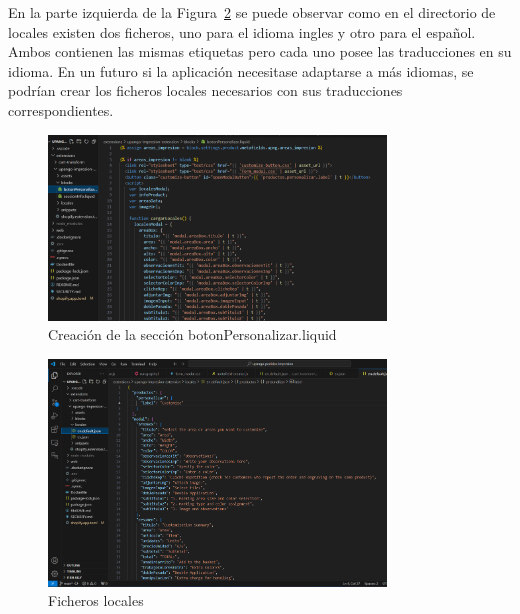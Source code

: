 \documentclass[11pt]{article}
\begin{document}
En la parte izquierda de la Figura~\ref{fig:locales} se puede observar como en el directorio de locales existen dos ficheros, uno para el idioma ingles y otro para el español. 
Ambos contienen las mismas etiquetas pero cada uno posee las traducciones en su idioma. En un futuro si la aplicación necesitase adaptarse a más idiomas, se podrían crear los ficheros locales
necesarios con sus traducciones correspondientes.


\begin{figure}[H]
    \centering
    \includegraphics[width=0.8\textwidth]{imagenesUS1/seccionPersonalizarBoton.png}
    \caption{\label{fig:creacionSeccion}Creación de la sección botonPersonalizar.liquid}
    \vspace{\fill}
\end{figure}

\begin{figure}[H]
    \centering
    \includegraphics[width=0.8\textwidth]{imagenesUS1/locales.png}
    \caption{\label{fig:locales}Ficheros locales}
    \vspace{\fill}
\end{figure}
\end{document}
